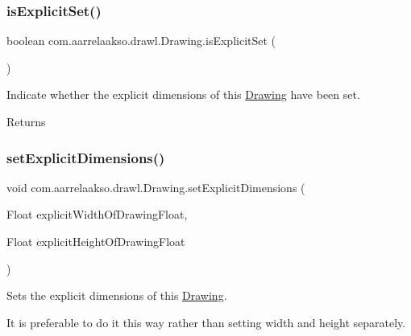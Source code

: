 \subsubsection{\texorpdfstring{is\+Explicit\+Set()}{isExplicitSet()}}
{\footnotesize\ttfamily boolean com.\+aarrelaakso.\+drawl.\+Drawing.\+is\+Explicit\+Set (\begin{DoxyParamCaption}{ }\end{DoxyParamCaption})\hspace{0.3cm}{\ttfamily [private]}}



Indicate whether the explicit dimensions of this \hyperlink{classcom_1_1aarrelaakso_1_1drawl_1_1_drawing}{Drawing} have been set. 

\begin{DoxyReturn}{Returns}

\end{DoxyReturn}
\mbox{\label{classcom_1_1aarrelaakso_1_1drawl_1_1_drawing_a1f6e1c7cc19b21dc114ce1fcaa4c0843}} 
\subsubsection{\texorpdfstring{set\+Explicit\+Dimensions()}{setExplicitDimensions()}\hspace{0.1cm}{\footnotesize\ttfamily [1/2]}}
{\footnotesize\ttfamily void com.\+aarrelaakso.\+drawl.\+Drawing.\+set\+Explicit\+Dimensions (\begin{DoxyParamCaption}\item[{Float}]{explicit\+Width\+Of\+Drawing\+Float,  }\item[{Float}]{explicit\+Height\+Of\+Drawing\+Float }\end{DoxyParamCaption})}



Sets the explicit dimensions of this \hyperlink{classcom_1_1aarrelaakso_1_1drawl_1_1_drawing}{Drawing}. 

It is preferable to do it this way rather than setting width and height separately.


